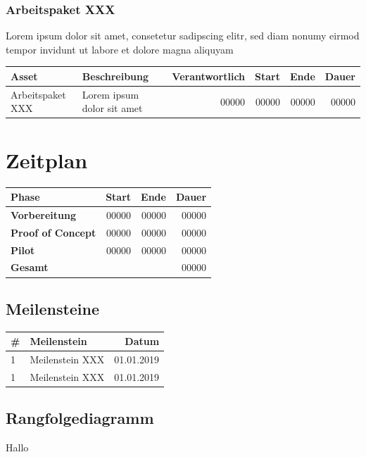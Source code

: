 \documentclass[a4paper,10pt]{scrartcl}
\begin{document}
\subsubsection{Arbeitspaket XXX}
Lorem ipsum dolor sit amet, consetetur sadipscing elitr, sed diam nonumy eirmod tempor invidunt ut labore et dolore magna aliquyam
\hfill \vspace{5mm}
\begin{tabular}{llrrrr} 
\toprule
\textbf{Asset} & \textbf{Beschreibung} & \textbf{Verantwortlich} & \textbf{Start} & \textbf{Ende} & \textbf{Dauer}\\ 
\midrule 
\midrule
Arbeitspaket XXX  & Lorem ipsum dolor sit amet & 00000 & 00000 & 00000 & 00000\\
\bottomrule
\end{tabular}

\vspace{5mm}

\section{Zeitplan}
\begin{tabular}{lrrr} 
\toprule
\textbf{Phase} & \textbf{Start} & \textbf{Ende} & \textbf{Dauer}\\ 
\midrule 
\midrule
\textbf{Vorbereitung} & 00000 & 00000 & 00000\\
\textbf{Proof of Concept} & 00000 & 00000 & 00000\\
\textbf{Pilot} & 00000 & 00000 & 00000\\
\midrule
\textbf{Gesamt} &  &  & 00000\\
\bottomrule
\end{tabular}

\subsection{Meilensteine}
\begin{tabular}{llr} 
\toprule
\textbf{\#} & \textbf{Meilenstein} & \textbf{Datum}\\ 
\midrule 
\midrule
1  & Meilenstein XXX & 01.01.2019\\
\midrule
1  & Meilenstein XXX & 01.01.2019\\
\bottomrule
\end{tabular}

\vspace{5mm}

\subsection{Rangfolgediagramm}
Hallo
\end{document}
